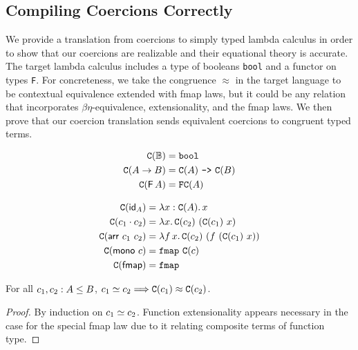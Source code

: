 \documentclass[acmsmall,screen]{acmart}
\begin{document}
\subsection{Compiling Coercions Correctly}
We provide a translation from coercions to simply typed lambda calculus in order
to show that our coercions are realizable and their equational theory is
accurate. The target lambda calculus includes a type of booleans \texttt{bool}
and a functor on types \texttt{F}. For concreteness, we take the congruence
\(\approx\) in the target language to be contextual equivalence extended with
fmap laws, but it could be any relation that incorporates
\(\beta\eta\)-equivalence, extensionality, and the fmap laws.  We then prove
that our coercion translation sends equivalent coercions to congruent typed
terms.\\
\begin{minipage}{0.5\textwidth}
\begin{align*}
  \text{\texttt{C}}(\mathbb{B}) &= \texttt{bool} \\
  \text{\texttt{C}}(A \to B) &= \text{\texttt{C}}(A) \ \text{\texttt{->}}\  \text{\texttt{C}}(B) \\
  \text{\texttt{C}}(\mathsf{F}\, A) &= \texttt{F} \text{\texttt{C}}(A) \\
\end{align*}
\end{minipage}
\begin{minipage}{0.5\textwidth}
\begin{align*}
  \cc{\cid{A}} &= \lambda x : \cc{A}.\, x \\
  \cc{\ccomp{c_1}{c_2}} &= \lambda x.\,\cc{c_2}\ (\cc{c_1}\ x) \\
  \cc{\carr\ c_1\ c_2} &= \lambda f\, x.\,\cc{c_2}\ (f\ (\cc{c_1}\ x)) \\
  \cc{\cmono\ c} &= \ltfmap\ \cc{c} \\
  \cc{\cfmap} &= \ltfmap
\end{align*}
\end{minipage}

\begin{proposition}\label{interp-sound}
  For all \(c_1, c_2 : A \leq B\), \(
    c_1 \simeq c_2 \Longrightarrow \text{\texttt{C}}(c_1) \approx \text{\texttt{C}}(c_2)
  \).
\end{proposition}
\begin{proof}
  By induction on \(c_1 \simeq c_2\). Function extensionality appears necessary in the case for the special fmap law due to it relating composite terms of function type.
\end{proof}
\end{document}
